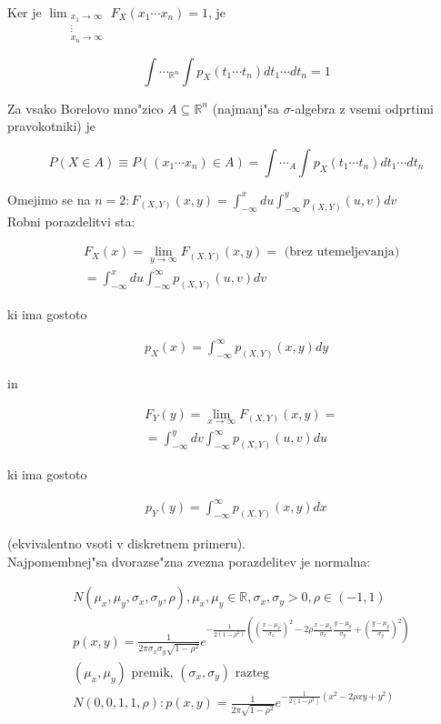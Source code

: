 \documentclass[a4paper,12pt]{article}
\theoremstyle{definition}
\theoremstyle{remark}
\newcommand{\R}{\mathbb{R}}
\begin{document}
Ker je $\lim_{\substack{x_1 \to \infty \\ \vdots \\ x_n \to \infty}} F_X(x_1 \cdots x_n) = 1$, je

\begin{equation*}
    \int \cdots_{\R^n} \int p_X(t_1 \cdots t_n) dt_1 \cdots dt_n = 1
\end{equation*}

Za vsako Borelovo mno"zico $A \subseteq \R^n$ (najmanj"sa $\sigma$-algebra z vsemi odprtimi pravokotniki) je

\begin{equation*}
    P(X \in A) \equiv P((x_1 \cdots x_n) \in A) = \int \cdots_{A} \int p_X(t_1 \cdots t_n) dt_1 \cdots dt_n
\end{equation*}

Omejimo se na $n=2: F_{(X,Y)}(x,y) = \int_{-\infty}^{x} du \int_{-\infty}^{y} p_{(X,Y)}(u,v) dv$ \\
Robni porazdelitvi sta:

\begin{align*}
    &F_X(x) = \lim_{y \to \infty} F_{(X,Y)}(x,y) = \text{ (brez utemeljevanja)} \\
    &= \int_{-\infty}^{x} du \int_{-\infty}^{\infty} p_{(X,Y)}(u,v) dv
\end{align*}

ki ima gostoto

\begin{align*}
    p_X(x) = \int_{-\infty}^{\infty} p_{(X,Y)}(x,y) dy
\end{align*}

in

\begin{align*}
    &F_Y(y) = \lim_{x \to \infty} F_{(X,Y)}(x,y) = \\
    &= \int_{-\infty}^{y} dv \int_{-\infty}^{\infty} p_{(X,Y)}(u,v) du
\end{align*}

ki ima gostoto

\begin{align*}
    p_Y(y) = \int_{-\infty}^{\infty} p_{(X,Y)}(x,y) dx
\end{align*}

(ekvivalentno vsoti v diskretnem primeru). \\
Najpomembnej"sa dvorazse"zna zvezna porazdelitev je normalna:

\begin{align*}
    &N(\mu_x, \mu_y, \sigma_x, \sigma_y, \rho), \mu_x, \mu_y \in \R, \sigma_x, \sigma_y > 0, \rho \in (-1,1) \\
    &p(x,y) = \frac{1}{2\pi \sigma_x \sigma_y \sqrt{1-\rho^2}} e^{-\frac{1}{2 (1-\rho^2)}
        ((\frac{x-\mu_x}{\sigma_x})^2 - 2 \rho \frac{x-\mu_x}{\sigma_x} \frac{y-\mu_y}{\sigma_y} +
        (\frac{y-\mu_y}{\sigma_y})^2)} \\
    &(\mu_x, \mu_y) \text{ premik, } (\sigma_x, \sigma_y) \text{ razteg} \\
    &N(0,0,1,1,\rho): p(x,y) = \frac{1}{2\pi \sqrt{1-\rho^2}} e^{-\frac{1}{2 (1-\rho^2)} (x^2 - 2 \rho x y + y^2)}
\end{align*}
\end{document}
